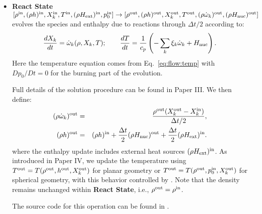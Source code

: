 \begin{itemize}
\item {\bf React State}$[\rho^{\mathrm{in}},(\rho h)^{\mathrm{in}},X_k^{\mathrm{in}},T^{\mathrm{in}}, (\rho{H_{\rm ext}})^{\mathrm{in}},                                                      
  p_0^{\mathrm{in}}] \rightarrow [\rho^{\mathrm{out}}, (\rho h)^{\mathrm{out}}, X_k^{\mathrm{out}},                                   
  T^{\mathrm{out}}, (\rho \dot{\omega}_k)^{\mathrm{out}}, (\rho{H_{\rm nuc}})^{\mathrm{out}}]$
  evolves the species and enthalpy due to reactions through
  $\Delta t/2$ according to:
\begin{equation}
\frac{dX_k}{dt} = \dot{\omega}_k(\rho,X_k,T) ; \qquad
\frac{dT}{dt}   = \frac{1}{c_p} \left ( -\sum_k \xi_k  \dot{\omega}_k  + {H_{\rm nuc}} \right ).
\end{equation}
Here the temperature equation comes from Eq.~\ref{eq:flow:temp} with $Dp_0/Dt = 0$ for
the burning part of the evolution.
  
Full details of the
solution procedure can be found in Paper III. We then define:
\begin{eqnarray}
(\rho\dot{\omega}_k)^{\mathrm{out}} &=& \frac{\rho^{\mathrm{out}} ( X_k^{\mathrm{out}} - X_k^{\mathrm{in}})}{\Delta t/2}, \\
(\rho h)^{\mathrm{out}} &=& (\rho h)^{\mathrm{in}} + \frac{\Delta t}{2} (\rho{H_{\rm nuc}})^{\mathrm{out}} + \frac{\Delta t}{2} (\rho{H_{\rm ext}})^{\mathrm{in}}.
\end{eqnarray}
where the enthalpy update includes external heat sources $(\rho{H_{\rm ext}})^{\mathrm{in}}$.
As introduced in Paper IV, we update the temperature using $T^{\mathrm{out}} = 
T(\rho^{\mathrm{out}},h^{\mathrm{out}},X_k^{\mathrm{out}})$ for planar geometry or $T^{\mathrm{out}} =
T(\rho^{\mathrm{out}},p_0^{\mathrm{in}},X_k^{\mathrm{out}})$ for spherical geometry, with this behavior
controlled by .
Note that the density remains unchanged within {\bf React State}, i.e.,
$\rho^{\mathrm{out}} = \rho^{\mathrm{in}}$.

The source code for this operation can be found in .



\end{itemize}
